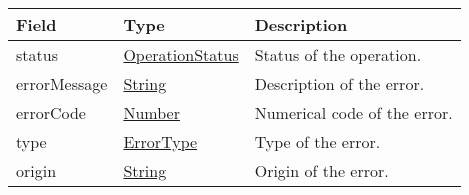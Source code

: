 \documentclass[a4paper]{arrowhead}
\newcommand{\pref}[1]{{\textcolor{ArrowheadGrey}{\hyperref[sec:model:primitives:#1]{#1}}}}
\begin{document}
\begin{table}[ht!]
\begin{tabularx}{\textwidth}{| p{4.25cm} | p{3.5cm} | X |} \hline
\rowcolor{gray!33} Field & Type      & Description \\ \hline
status & \pref{OperationStatus} & Status of the operation. \\ \hline
errorMessage & \pref{String} & Description of the error. \\ \hline
errorCode &\pref{Number}  & Numerical code of the error. \\ \hline
type & \pref{ErrorType} & Type of the error. \\ \hline
origin & \pref{String} & Origin of the error. \\ \hline
\end{tabularx}
\end{table}

\end{document}
